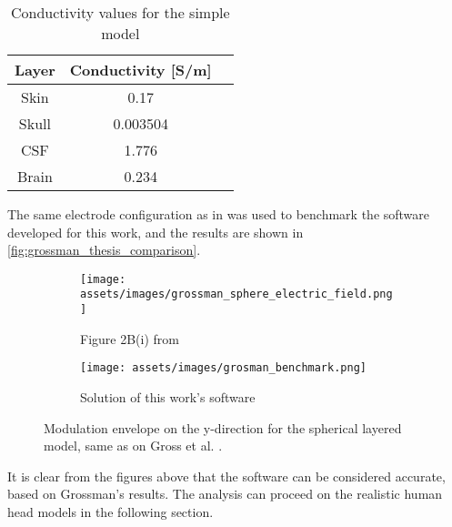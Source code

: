 \begin{table}[!ht]
\centering
\caption{Conductivity values for the simple model \cite{ITstissue}}
\label{tab:grossman_conductivity_vals}
\begin{tabular}{|c|c|c|}
    \hline
    \rowcolor[HTML]{C0C0C0} 
    {\color[HTML]{000000} \textbf{Layer}} & {\color[HTML]{000000} \textbf{Conductivity {[}S/m{]}}} \\ \hline
    Skin & 0.17 \\ \hline
    Skull & 0.003504 \\ \hline
    CSF & 1.776 \\ \hline
    Brain & 0.234 \\ \hline
\end{tabular}
\end{table}

The same electrode configuration as in  was used to benchmark the software developed for this work, and the results are shown in \autoref{fig:grossman_thesis_comparison}.
\begin{figure}[H]
    \centering
    \begin{subfigure}[b]{0.49\textwidth}
        \centering
        \texttt{[image: assets/images/grossman\_sphere\_electric\_field.png]}
        \caption{Figure 2B(i) from }
        \label{fig:grossman_envelope}
    \end{subfigure}
    \begin{subfigure}[b]{0.49\textwidth}
        \centering
        \texttt{[image: assets/images/grosman\_benchmark.png]}
        \caption{Solution of this work's software}
        \label{fig:envelope_at_y_benchmark}
    \end{subfigure}
    \caption[Modulation envelope on the y-direction for the spherical layered model]{Modulation envelope on the y-direction for the spherical layered model, same as on Gross et al. \cite[Figure 2B]{Grossman2017}.}
    \label{fig:grossman_thesis_comparison}
\end{figure}

It is clear from the figures above that the software can be considered accurate, based on Grossman's results. The analysis can proceed on the realistic human head models in the following section.

